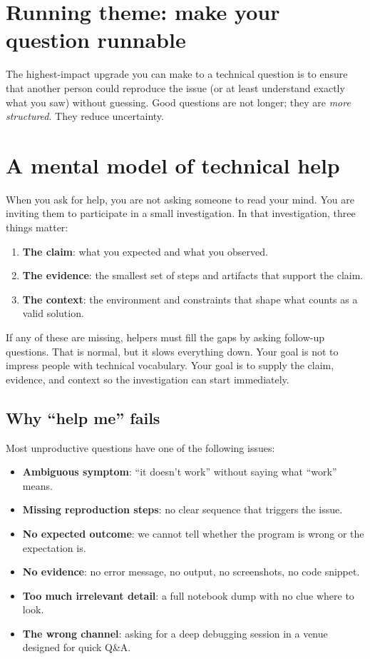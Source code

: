 \section*{Running theme: make your question runnable}
The highest-impact upgrade you can make to a technical question is to ensure that another person could reproduce the issue (or at least understand exactly what you saw) without guessing. Good questions are not longer; they are \emph{more structured}. They reduce uncertainty.

\section{A mental model of technical help}
When you ask for help, you are not asking someone to read your mind. You are inviting them to participate in a small investigation. In that investigation, three things matter:
\begin{enumerate}[noitemsep]
  \item \textbf{The claim}: what you expected and what you observed.
  \item \textbf{The evidence}: the smallest set of steps and artifacts that support the claim.
  \item \textbf{The context}: the environment and constraints that shape what counts as a valid solution.
\end{enumerate}

If any of these are missing, helpers must fill the gaps by asking follow-up questions. That is normal, but it slows everything down. Your goal is not to impress people with technical vocabulary. Your goal is to supply the claim, evidence, and context so the investigation can start immediately.

\subsection{Why ``help me'' fails}
Most unproductive questions have one of the following issues:
\begin{itemize}[noitemsep]
  \item \textbf{Ambiguous symptom}: ``it doesn't work'' without saying what ``work'' means.
  \item \textbf{Missing reproduction steps}: no clear sequence that triggers the issue.
  \item \textbf{No expected outcome}: we cannot tell whether the program is wrong or the expectation is.
  \item \textbf{No evidence}: no error message, no output, no screenshots, no code snippet.
  \item \textbf{Too much irrelevant detail}: a full notebook dump with no clue where to look.
  \item \textbf{The wrong channel}: asking for a deep debugging session in a venue designed for quick Q\&A.
\end{itemize}

